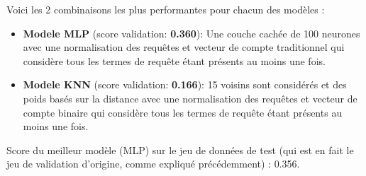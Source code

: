 Voici les 2 combinaisons les plus performantes pour chacun des modèles :

\begin{itemize}
  \item \textbf{Modele MLP} (score validation: \textbf{0.360}): Une couche cachée de 100 neurones avec une normalisation des requêtes et vecteur de compte traditionnel qui considère tous les termes de requête étant présents au moins une fois.
  \item \textbf{Modele KNN} (score validation: \textbf{0.166}): 15 voisins sont considérés et des poids basés sur la distance avec une normalisation des requêtes et vecteur de compte binaire qui considère tous les termes de requête étant présents au moins une fois.
\end{itemize}

Score du meilleur modèle (MLP) sur le jeu de données de test (qui est en fait le jeu de validation d'origine, comme expliqué précédemment) : 0.356.


